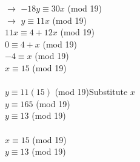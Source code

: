 \documentclass[11pt,letterpaper]{article}
\begin{document}
\begin{enumerate}[(a)]
$\rightarrow$ $-18y\equiv30x$ (mod 19)\\
$\rightarrow$ $y\equiv11x$ (mod 19)\\
$11x\equiv4+12x$ (mod 19)\\
$0\equiv4+x$ (mod 19)\\
$-4\equiv x$ (mod 19)\\
$x\equiv 15$ (mod 19)\\\\
$y\equiv11(15)$ (mod 19)\hfill Substitute $x$\\
$y\equiv165$ (mod 19)\\
$y\equiv13$ (mod 19)\\
\\
$x\equiv 15$ (mod 19)\\
$y\equiv13$ (mod 19)\\

\end{enumerate}
\clearpage
\end{document}
